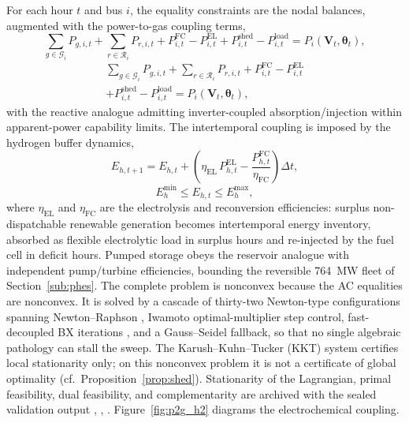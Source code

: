 For each hour $t$ and bus $i$, the equality constraints are the nodal balances, augmented with the power-to-gas coupling terms,
\ifCLASSOPTIONonecolumn
\begin{equation}
\sum_{g \in \mathcal{G}_i} P_{g,i,t} + \sum_{r \in \mathcal{R}_i} P_{r,i,t} + P_{i,t}^{\mathrm{FC}} - P_{i,t}^{\mathrm{EL}} + P_{i,t}^{\mathrm{shed}} - P_{i,t}^{\mathrm{load}} = P_i(\mathbf{V}_t, \boldsymbol{\theta}_t),
\label{eq:opf_balance}
\end{equation}
\else
\begin{multline}
\sum_{g \in \mathcal{G}_i} P_{g,i,t} + \sum_{r \in \mathcal{R}_i} P_{r,i,t} + P_{i,t}^{\mathrm{FC}} - P_{i,t}^{\mathrm{EL}} \\
+ P_{i,t}^{\mathrm{shed}} - P_{i,t}^{\mathrm{load}} = P_i(\mathbf{V}_t, \boldsymbol{\theta}_t),
\label{eq:opf_balance}
\end{multline}
\fi
with the reactive analogue admitting inverter-coupled absorption/injection within apparent-power capability limits. The intertemporal coupling is imposed by the hydrogen buffer dynamics,
\begin{equation}
E_{h,t+1} = E_{h,t} + \left(\eta_{\mathrm{EL}}\, P_{h,t}^{\mathrm{EL}} - \frac{P_{h,t}^{\mathrm{FC}}}{\eta_{\mathrm{FC}}}\right) \Delta t,
\label{eq:h2_storage}
\end{equation}
\begin{equation}
E_h^{\min} \le E_{h,t} \le E_h^{\max},
\label{eq:h2_limits}
\end{equation}
where $\eta_{\mathrm{EL}}$ and $\eta_{\mathrm{FC}}$ are the electrolysis and reconversion efficiencies: surplus non-dispatchable renewable generation becomes intertemporal energy inventory, absorbed as flexible electrolytic load in surplus hours and re-injected by the fuel cell in deficit hours. Pumped storage obeys the reservoir analogue with independent pump/turbine efficiencies, bounding the reversible 764~MW fleet of Section~\ref{sub:phes}. The complete problem is nonconvex because the AC equalities are nonconvex. It is solved by a cascade of thirty-two Newton-type configurations spanning Newton--Raphson \cite{tinney1967}, Iwamoto optimal-multiplier step control, fast-decoupled BX iterations \cite{stott1974}, and a Gauss--Seidel fallback, so that no single algebraic pathology can stall the sweep. The Karush--Kuhn--Tucker (KKT) system certifies local stationarity only; on this nonconvex problem it is not a certificate of global optimality (cf.\ Proposition~\ref{prop:shed}). Stationarity of the Lagrangian, primal feasibility, dual feasibility, and complementarity are archived with the sealed validation output \cite{nocedal2006}, \cite{dommel1968}, \cite{wood2013}. Figure~\ref{fig:p2g_h2} diagrams the electrochemical coupling.

